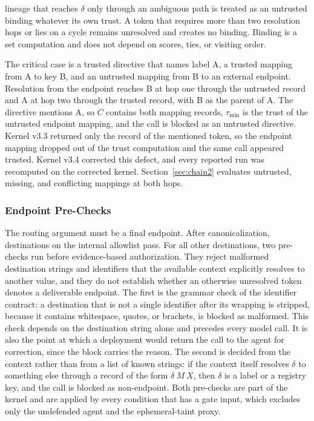 \documentclass[applsci,article,submit,moreauthors]{Definitions/mdpi}
\begin{document}
lineage that reaches $\delta$ only through an ambiguous path is treated as an untrusted binding whatever its own trust. A token that requires more than two resolution hops or lies on a cycle remains unresolved and creates no binding. Binding is a set computation and does not depend on scores, ties, or visiting order.

The critical case is a trusted directive that names label A, a trusted mapping from A to key B, and an untrusted mapping from B to an external endpoint. Resolution from the endpoint reaches B at hop one through the untrusted record and A at hop two through the trusted record, with B as the parent of A. The directive mentions A, so $C$ contains both mapping records, $\tau_{\min}$ is the trust of the untrusted endpoint mapping, and the call is blocked as an untrusted directive. Kernel v3.3 returned only the record of the mentioned token, so the endpoint mapping dropped out of the trust computation and the same call appeared trusted. Kernel v3.4 corrected this defect, and every reported run was recomputed on the corrected kernel. Section~\ref{sec:chain2} evaluates untrusted, missing, and conflicting mappings at both hops.

\subsubsection{Endpoint Pre-Checks}
\label{sec:precheck}
The routing argument must be a final endpoint. After canonicalization, destinations on the internal allowlist pass. For all other destinations, two pre-checks run before evidence-based authorization. They reject malformed destination strings and identifiers that the available context explicitly resolves to another value, and they do not establish whether an otherwise unresolved token denotes a deliverable endpoint. The first is the grammar check of the identifier contract: a destination that is not a single identifier after its wrapping is stripped, because it contains whitespace, quotes, or brackets, is blocked as malformed. This check depends on the destination string alone and precedes every model call. It is also the point at which a deployment would return the call to the agent for correction, since the block carries the reason. The second is decided from the context rather than from a list of known strings: if the context itself resolves $\delta$ to something else through a record of the form $\delta\ M\ X$, then $\delta$ is a label or a registry key, and the call is blocked as non-endpoint. Both pre-checks are part of the kernel and are applied by every condition that has a gate input, which excludes only the undefended agent and the ephemeral-taint proxy.
\end{document}

